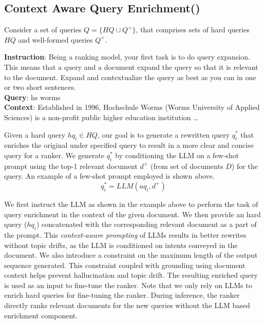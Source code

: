 \subsection{Context Aware Query Enrichment(\car{})}
\label{rewriter:method}
Consider a set of queries $Q=\{HQ \cup Q^+\}$, that comprises sets of hard queries $HQ$ and well-formed queries $Q^+$.
\begin{tcolorbox}[title= Example Prompt]
\small
\begin{minipage}{\textwidth}
\textbf{Instruction}: Being a ranking model, your first task is to do query
expansion. This means that a query and a document expand
the query so that it is relevant to the document. Expand and
contextualize the query as best as you can in one or two
short sentences.\\
\textbf{Query}: hs worms \texttt{} \\
\textbf{Context}: Established in 1996, Hochschule Worms (Worms University of Applied Sciences) is a non-profit public higher education institution 
 \dots \texttt{}
 \end{minipage}
 

\end{tcolorbox}

Given a hard query $hq_i \in HQ$, our goal is to generate a rewritten query $q_i^*$ that enriches the original under specified query to result in a more clear and concise query for a ranker. We generate $q_i^*$ by conditioning the LLM on a few-shot prompt using the top-1 relevant document $d^+$ (from set of documents $D$) for the query. An example of a few-shot prompt employed is  shown above.
\[q_i^* = LLM(aq_i,d^+)\]

We first instruct the LLM as shown in the example above to perform the task of query enrichment in the context of the given document. We then provide an hard query ($hq_i$) concatenated with the corresponding relevant document as a part of the prompt. This \textit{context-aware prompting} of LLMs results in better rewrites without topic drifts, as the LLM is conditioned on intents conveyed in the document. We also introduce a constraint on the maximum length of the output sequence generated. This constraint coupled with grounding using document context helps prevent hallucination and topic drift.
The resulting enriched query is used as an input to fine-tune the ranker.
Note that we only rely on LLMs to enrich hard queries for fine-tuning the ranker. During inference, the ranker directly ranks relevant documents for the new queries without the LLM based enrichment component. 

